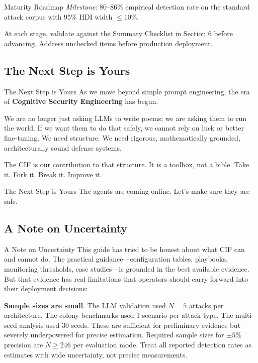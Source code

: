 \documentclass[
  ignorenonframetext,
]{beamer}
\begin{document}
\begin{frame}[allowframebreaks]{Maturity Roadmap}
\emph{Milestone}: 80--86\% empirical detection rate on the standard
attack corpus with 95\% HDI width \(\leq 10\%\).

At each stage, validate against the Summary Checklist in Section 6
before advancing. Address unchecked items before production deployment.
\end{frame}

\subsection{The Next Step is Yours}\label{the-next-step-is-yours}

\begin{frame}[allowframebreaks]{The Next Step is Yours}
As we move beyond simple prompt engineering, the era of
\textbf{Cognitive Security Engineering} has begun.

We are no longer just asking LLMs to write poems; we are asking them to
run the world. If we want them to do that safely, we cannot rely on luck
or better fine-tuning. We need structure. We need rigorous,
mathematically grounded, architecturally sound defense systems.

The CIF is our contribution to that structure. It is a toolbox, not a
bible. Take it. Fork it. Break it. Improve it.

\end{frame}

\begin{frame}[allowframebreaks]{The Next Step is Yours}
The agents are coming online. Let's make sure they are safe.
\end{frame}

\subsection{A Note on Uncertainty}\label{sec:uncertainty-note}

\begin{frame}[allowframebreaks]{A Note on Uncertainty}
This guide has tried to be honest about what CIF can and cannot do. The
practical guidance---configuration tables, playbooks, monitoring
thresholds, case studies---is grounded in the best available evidence.
But that evidence has real limitations that operators should carry
forward into their deployment decisions:

\textbf{Sample sizes are small}. The LLM validation used \(N=5\) attacks
per architecture. The colony benchmarks used 1 scenario per attack type.
The multi-seed analysis used 30 seeds. These are sufficient for
preliminary evidence but severely underpowered for precise estimation.
Required sample sizes for \(\pm 5\%\) precision are \(N \geq 246\) per
evaluation mode. Treat all reported detection rates as estimates with
wide uncertainty, not precise measurements.

\end{frame}
\end{document}
